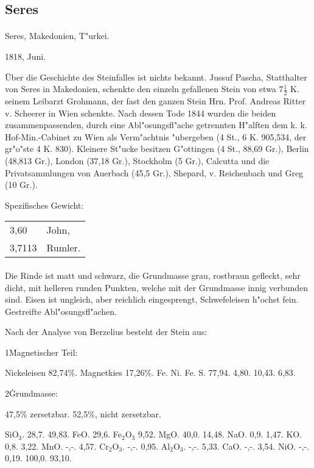 \documentclass[a4paper, 11pt, oneside]{article}
\begin{document}
\subsection{Seres}
\normalsize
\paragraph{}
Seres, Makedonien, T"urkei.

1818, Juni.

Über die Geschichte des Steinfalles ist nichts bekannt. Jussuf Pascha, Statthalter von Seres in Makedonien, schenkte den einzeln gefallenen Stein von etwa $7\frac{1}{2}$ K. seinem Leibarzt Grohmann, der fast den ganzen Stein Hrn. Prof. Andreas Ritter v. Scheerer in Wien schenkte. Nach dessen Tode 1844 wurden die beiden zusammenpassenden, durch eine Abl"osungsfl"ache getrennten H"alften dem k. k. Hof-Min.-Cabinet zu Wien als Verm"achtnis "ubergeben (4 St., 6 K. 905,534, der gr"o"ste 4 K. 830). Kleinere St"ucke besitzen G"ottingen (4 St., 88,69 Gr.), Berlin (48,813 Gr.), London (37,18 Gr.), Stockholm (5 Gr.), Calcutta und die Privatsammlungen von Auerbach (45,5 Gr.), Shepard, v. Reichenbach und Greg (10 Gr.).

Spezifisches Gewicht:
\begin{table}[!ht]
    \centering
    \begin{tabular}{l l}
        3,60 & John,\\
        3,7113 & Rumler.
    \end{tabular}
\end{table}
\paragraph{}
Die Rinde ist matt und schwarz, die Grundmasse grau, rostbraun gefleckt, sehr dicht, mit helleren runden Punkten, welche mit der Grundmasse innig verbunden sind. Eisen ist ungleich, aber reichlich eingesprengt, Schwefeleisen h"ochst fein. Gestreifte Abl"osungsfl"achen.

Nach der Analyse von Berzelius besteht der Stein aus:

1\. Magnetischer Teil:

Nickeleisen 82,74\%. Magnetkies 17,26\%.  
Fe. Ni. Fe. S.  
77,94. 4,80. 10,43. 6,83.

2\. Grundmasse:

47,5\% zersetzbar. 52,5\%, nicht zersetzbar.

SiO$_{3}$. 28,7. 49,83.  
FeO. 29,6. Fe$_{2}$O$_{3}$ 9,52.  
MgO. 40,0. 14,48.  
NaO. 0,9. 1,47.  
KO. 0,8. 3,22.  
MnO. -,-. 4,57.  
Cr$_{2}$O$_{3}$. -,-. 0,95.  
Al$_{2}$O$_{3}$. -,-. 5,33.  
CaO. -,-. 3,54.  
NiO. -,-. 0,19.  
 100,0. 93,10.
\end{document}
